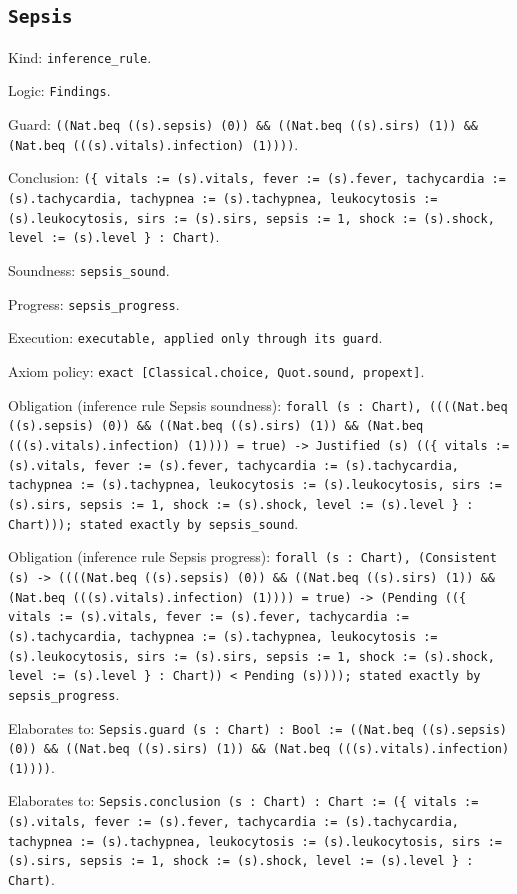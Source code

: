 \documentclass[11pt]{article}
\begin{document}
\subsection*{\texttt{Sepsis}}
\noindent Kind: \texttt{inference_rule}.\par
\noindent Logic: \texttt{Findings}.\par
\noindent Guard: \texttt{((Nat.beq ((s).sepsis) (0)) \&\& ((Nat.beq ((s).sirs) (1)) \&\& (Nat.beq (((s).vitals).infection) (1))))}.\par
\noindent Conclusion: \texttt{(\{ vitals := (s).vitals, fever := (s).fever, tachycardia := (s).tachycardia, tachypnea := (s).tachypnea, leukocytosis := (s).leukocytosis, sirs := (s).sirs, sepsis := 1, shock := (s).shock, level := (s).level \} : Chart)}.\par
\noindent Soundness: \texttt{sepsis\_sound}.\par
\noindent Progress: \texttt{sepsis\_progress}.\par
\noindent Execution: \texttt{executable, applied only through its guard}.\par
\noindent Axiom policy: \texttt{exact [Classical.choice, Quot.sound, propext]}.\par
\noindent Obligation (inference rule Sepsis soundness): \texttt{forall (s : Chart), ((((Nat.beq ((s).sepsis) (0)) \&\& ((Nat.beq ((s).sirs) (1)) \&\& (Nat.beq (((s).vitals).infection) (1)))) = true) -> Justified (s) ((\{ vitals := (s).vitals, fever := (s).fever, tachycardia := (s).tachycardia, tachypnea := (s).tachypnea, leukocytosis := (s).leukocytosis, sirs := (s).sirs, sepsis := 1, shock := (s).shock, level := (s).level \} : Chart))); stated exactly by sepsis\_sound}.\par
\noindent Obligation (inference rule Sepsis progress): \texttt{forall (s : Chart), (Consistent (s) -> ((((Nat.beq ((s).sepsis) (0)) \&\& ((Nat.beq ((s).sirs) (1)) \&\& (Nat.beq (((s).vitals).infection) (1)))) = true) -> (Pending ((\{ vitals := (s).vitals, fever := (s).fever, tachycardia := (s).tachycardia, tachypnea := (s).tachypnea, leukocytosis := (s).leukocytosis, sirs := (s).sirs, sepsis := 1, shock := (s).shock, level := (s).level \} : Chart)) < Pending (s)))); stated exactly by sepsis\_progress}.\par
\noindent Elaborates to: \texttt{Sepsis.guard (s : Chart) : Bool := ((Nat.beq ((s).sepsis) (0)) \&\& ((Nat.beq ((s).sirs) (1)) \&\& (Nat.beq (((s).vitals).infection) (1))))}.\par
\noindent Elaborates to: \texttt{Sepsis.conclusion (s : Chart) : Chart := (\{ vitals := (s).vitals, fever := (s).fever, tachycardia := (s).tachycardia, tachypnea := (s).tachypnea, leukocytosis := (s).leukocytosis, sirs := (s).sirs, sepsis := 1, shock := (s).shock, level := (s).level \} : Chart)}.\par
\end{document}
